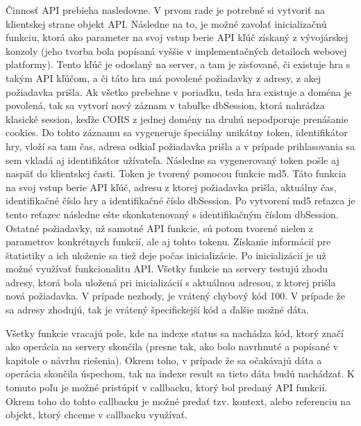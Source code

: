 Činnosť API prebieha nasledovne. V prvom rade je potrebné si vytvoriť na klientskej strane objekt API. Následne na to, je možné zavolať inicializačnú funkciu, ktorá ako parameter na svoj vstup berie API kľúč získaný z vývojárskej konzoly (jeho tvorba bola popísaná vyššie v implementačných detailoch webovej platformy). Tento kľúč je odoslaný na server, a tam je zisťované, či existuje hra s takým API kľúčom, a či táto hra má povolené požiadavky z adresy, z akej požiadavka prišla. Ak všetko prebehne v poriadku, teda hra existuje a doména je povolená, tak sa vytvorí nový záznam v tabuľke dbSession, ktorá nahrádza klasické session, keďže CORS z jednej domény na druhú nepodporuje prenášanie cookies. Do tohto záznamu sa vygeneruje špeciálny unikátny token, identifikátor hry, vloží sa tam čas, adresa odkiaľ požiadavka prišla a v prípade prihlasovania sa sem vkladá aj identifikátor užívateľa.  Následne sa vygenerovaný token pošle aj naspäť do klientskej časti. Token je tvorený pomocou funkcie md5. Táto funkcia na svoj vstup berie API kľúč, adresu z ktorej požiadavka prišla, aktuálny čas, identifikačné číslo hry a identifikačné číslo dbSession. Po vytvorení md5 reťazca je tento reťazec následne ešte skonkatenovaný s identifikačným číslom dbSession. Ostatné požiadavky, už samotné API funkcie, sú potom tvorené nielen z parametrov konkrétnych funkcií, ale aj tohto tokenu. Získanie informácií pre štatistiky  a ich uloženie sa tiež deje počas inicializácie. Po inicializácií je už možné využívať funkcionalitu API. Všetky funkcie na servery testujú zhodu adresy, ktorá bola uložená pri inicializácií s aktuálnou adresou, z ktorej prišla nová požiadavka. V prípade nezhody, je vrátený chybový kód 100. V prípade že sa adresy zhodujú, tak je vrátený špecifickejší kód a ďalšie možné dáta.

Všetky funkcie vracajú pole, kde na indexe status sa nachádza kód, ktorý značí ako operácia na servery skončila (presne tak, ako bolo navrhnuté a popísané v kapitole o návrhu riešenia). Okrem toho, v prípade že sa očakávajú dáta a operácia skončila úspechom, tak na indexe result sa tieto dáta budú nachádzať. K tomuto poľu je možné pristúpiť v callbacku, ktorý bol predaný API funkcií. Okrem toho do tohto callbacku je možné predať tzv. kontext, alebo referenciu na objekt, ktorý chceme v callbacku využívať. 


